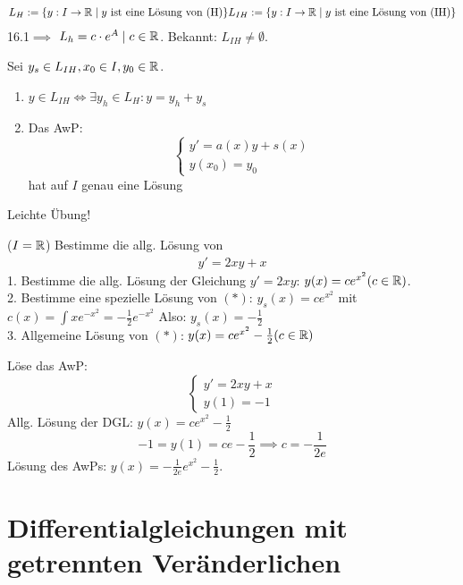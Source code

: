 \documentclass[a4paper,twoside,DIV15,BCOR12mm,chapterprefix=true,headings=twolinechapter]{scrbook}
\begin{document}
\begin{definition}
\begin{align*}
L_H:=\{y:I\to\mathbb{R}\mid y\text{ ist eine Lösung von (H)}\}
L_{IH}:=\{y:I\to\mathbb{R}\mid y\text{ ist eine Lösung von (IH)}\}
\end{align*}
16.1$\implies$ $L_h={c\cdot e^{A}\mid c\in \mathbb{R}}$. Bekannt: $L_{IH}\ne\emptyset$.
\end{definition}

\begin{satz}
Sei $y_s\in L_{IH}, x_0\in I,y_0\in \mathbb{R}$.
\begin{enumerate}
\item $y\in L_{IH}\iff \exists y_h\in L_{H}: y=y_h+y_s$
\item Das AwP:
\[\begin{cases}
y'=a(x)y+s(x)\\
y(x_0)=y_0
\end{cases}\]
hat auf $I$ genau eine Lösung
\end{enumerate}
\end{satz}

\begin{beweis}
Leichte Übung!
\end{beweis}

\begin{beispiele}
\item ($I=\mathbb{R}$) Bestimme die allg. Lösung von
\begin{align*}
y'=2xy+x\tag{$*$}
\end{align*}
1. Bestimme die allg. Lösung der Gleichung $y'=2xy$: $y(x)=ce^{x^2} (c\in\mathbb{R})$.\\
2. Bestimme eine spezielle Lösung von $(*)$: $y_s(x)=ce^{x^2}$ mit $c(x)=\int xe^{-x^2}=-\frac 12 e^{-x^2}$
Also: $y_s(x)=-\frac12$\\
3. Allgemeine Lösung von $(*)$: $y(x)=ce^{x^2}-\frac 12 (c\in\mathbb{R})$
\item Löse das AwP:
\[\begin{cases}
y'=2xy+x\\
y(1)=-1
\end{cases}\]
Allg. Lösung der DGL: $y(x)=ce^{x^2}-\frac 12$\\
\[-1=y(1)=ce-\frac 12\implies c=-\frac 1{2e}\]
Lösung des AwPs: $y(x)=-\frac1{2e}e^{x^2}-\frac 12$.
\end{beispiele}

\chapter{Differentialgleichungen mit getrennten Veränderlichen}
\end{document}
